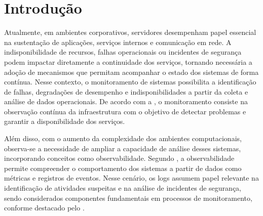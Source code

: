 \documentclass[
    12pt
    ,oneside
    ,a4paper
    ,chapter=TITLE
    ,section=TITLE
    ,sumario=abnt-6027-2012]{abntex2}
\begin{document}

\sumario

\textual

\chapter{Introdução}
\label{cap:introducao}

Atualmente, em ambientes corporativos, servidores desempenham papel essencial na sustentação de aplicações, serviços internos e comunicação em rede. A indisponibilidade de recursos, falhas operacionais ou incidentes de segurança podem impactar diretamente a continuidade dos serviços, tornando necessária a adoção de mecanismos que permitam acompanhar o estado dos sistemas de forma contínua. Nesse contexto, o monitoramento de sistemas possibilita a identificação de falhas, degradações de desempenho e indisponibilidades a partir da coleta e análise de dados operacionais. De acordo com a , o monitoramento consiste na observação contínua da infraestrutura com o objetivo de detectar problemas e garantir a disponibilidade dos serviços.

Além disso, com o aumento da complexidade dos ambientes computacionais, observa-se a necessidade de ampliar a capacidade de análise desses sistemas, incorporando conceitos como observabilidade. Segundo , a observabilidade permite compreender o comportamento dos sistemas a partir de dados como métricas e registros de eventos. Nesse cenário, os logs assumem papel relevante na identificação de atividades suspeitas e na análise de incidentes de segurança, sendo considerados componentes fundamentais em processos de monitoramento, conforme destacado pelo .
\end{document}

